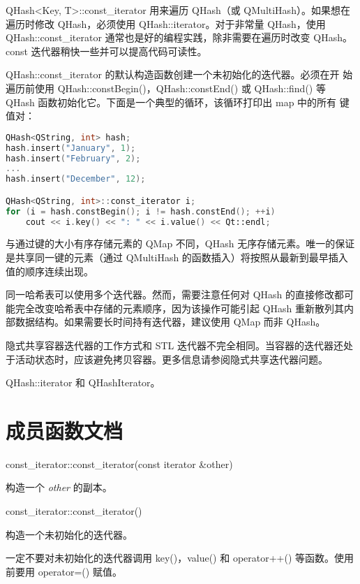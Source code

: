 QHash<Key, T>::const\_iterator 用来遍历 QHash（或 QMultiHash）。如果想在遍历时修改 QHash，必须使用 QHash::iterator。对于非常量 QHash，使用 QHash::const\_iterator 通常也是好的编程实践，除非需要在遍历时改变 QHash。const 迭代器稍快一些并可以提高代码可读性。

QHash::const\_iterator 的默认构造函数创建一个未初始化的迭代器。必须在开
始遍历前使用 QHash::constBegin()，QHash::constEnd() 或 QHash::find()
等 QHash 函数初始化它。下面是一个典型的循环，该循环打印出 map 中的所有
键值对：

\begin{lstlisting}[language=C++]
QHash<QString, int> hash;
hash.insert("January", 1);
hash.insert("February", 2);
...
hash.insert("December", 12);

QHash<QString, int>::const_iterator i;
for (i = hash.constBegin(); i != hash.constEnd(); ++i)
    cout << i.key() << ": " << i.value() << Qt::endl;
\end{lstlisting}

与通过键的大小有序存储元素的 QMap 不同，QHash 无序存储元素。唯一的保证是共享同一键的元素（通过 QMultiHash 的函数插入）将按照从最新到最早插入值的顺序连续出现。

同一哈希表可以使用多个迭代器。然而，需要注意任何对 QHash 的直接修改都可能完全改变哈希表中存储的元素顺序，因为该操作可能引起 QHash 重新散列其内部数据结构。如果需要长时间持有迭代器，建议使用 QMap 而非 QHash。

\begin{notice}
	隐式共享容器迭代器的工作方式和 STL 迭代器不完全相同。当容器的迭代器还处于活动状态时，应该避免拷贝容器。更多信息请参阅隐式共享迭代器问题。
\end{notice}



\begin{notice}[另请参阅]
 QHash::iterator 和 QHashIterator。
\end{notice}

\splitLine

\section{成员函数文档}

const\_iterator::const\_iterator(const iterator \&other)

构造一个 \emph{other} 的副本。

const\_iterator::const\_iterator()

构造一个未初始化的迭代器。

一定不要对未初始化的迭代器调用 key()，value() 和 operator++() 等函数。使用前要用 operator=() 赋值。



